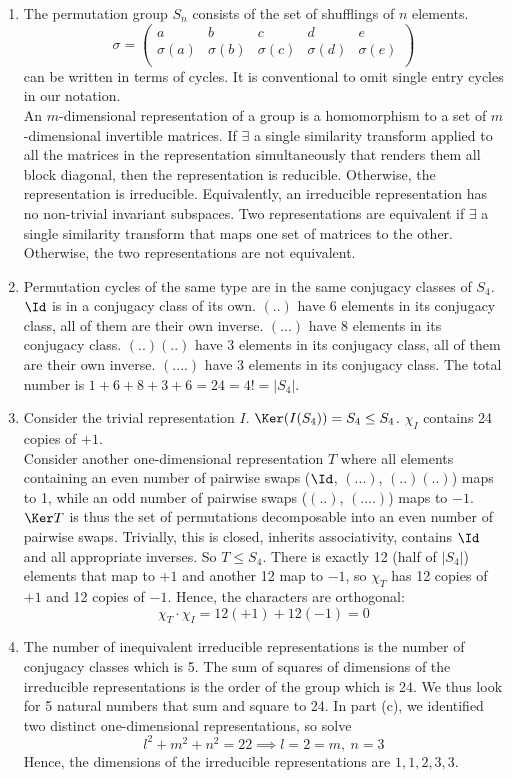 \documentclass[a4paper]{article}
\begin{document}
\begin{ans}\leavevmode
\begin{enumerate}[label=(\alph*)]
\item The permutation group $S_n$ consists of the set of shufflings of $n$ elements.
$$\sigma=\begin{pmatrix}a&b&c&d&e\\\sigma(a)&\sigma(b)&\sigma(c)&\sigma(d)&\sigma(e)\\\end{pmatrix}$$
can be written in terms of cycles. It is conventional to omit single entry cycles in our notation.\\[5pt]
An $m$-dimensional representation of a group is a homomorphism to a set of $m$-dimensional invertible matrices. If $\exists$ a single similarity transform applied to all the matrices in the representation simultaneously that renders them all block diagonal, then the representation is reducible. Otherwise, the representation is irreducible. Equivalently, an irreducible representation has no non-trivial invariant subspaces. Two representations are equivalent if $\exists$ a single similarity transform that maps one set of matrices to the other. Otherwise, the two representations are not equivalent.
\item Permutation cycles of the same type are in the same conjugacy classes of $S_4$. $\Id$ is in a conjugacy class of its own. $(..)$ have 6 elements in its conjugacy class, all of them are their own inverse. $(...)$ have 8 elements in its conjugacy class. $(..)(..)$ have 3 elements in its conjugacy class, all of them are their own inverse. $(....)$ have 3 elements in its conjugacy class. The total number is $1+6+8+3+6=24=4!=|S_4|$.
\item Consider the trivial representation $I$. $\Ker(I(S_4))=S_4\leq S_4$. $\chi_I$ contains 24 copies of $+1$.\\[5pt]
Consider another one-dimensional representation $T$ where all elements containing an even number of pairwise swaps ($\Id$, $(...)$, $(..)(..)$) maps to 1, while an odd number of pairwise swaps ($(..)$, $(....)$) maps to $-1$. $\Ker T$ is thus the set of permutations decomposable into an even number of pairwise swaps. Trivially, this is closed, inherits associativity, contains $\Id$ and all appropriate inverses. So $T\leq S_4$. There is exactly 12 (half of $|S_4|$) elements that map to $+1$ and another 12 map to $-1$, so $\chi_T$ has 12 copies of $+1$ and 12 copies of $-1$. Hence, the characters are orthogonal:
$$\chi_T\cdot\chi_I=12(+1)+12(-1)=0$$
\item The number of inequivalent irreducible representations is the number of conjugacy classes which is 5. The sum of squares of dimensions of the irreducible representations is the order of the group which is 24. We thus look for 5 natural numbers that sum and square to 24. In part (c), we identified two distinct one-dimensional representations, so solve
$$l^2+m^2+n^2=22\implies l=2=m,~n=3$$
Hence, the dimensions of the irreducible representations are $1,1,2,3,3$.

\end{enumerate}
\end{ans}
\end{document}
